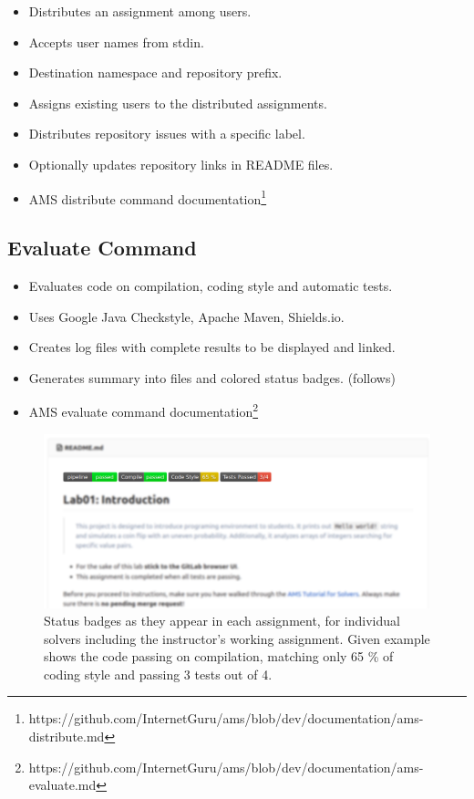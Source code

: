 \begin{itemize}
\item
  {Distributes an assignment among users.}
\item
  {Accepts user names from stdin.}
\item
  {Destination namespace and repository prefix.}
\item
  {Assigns existing users to the distributed assignments.}
\item
  {Distributes repository issues with a specific label.}
\item
  {Optionally updates repository links in README files.}
\item
  {AMS distribute command documentation\footnote{https://github.com/InternetGuru/ams/blob/dev/documentation/ams-distribute.md}}
\end{itemize}

\subsection{Evaluate Command}\label{ssec:evalcmd}

\begin{itemize}
\item
  {Evaluates code on compilation, coding style and automatic tests.}
\item
  {Uses Google Java Checkstyle, Apache Maven, Shields.io.}
\item
  {Creates log files with complete results to be displayed and linked.}
\item
  {Generates summary into files and colored status badges. (follows)}
\item
  {AMS evaluate command documentation\footnote{https://github.com/InternetGuru/ams/blob/dev/documentation/ams-evaluate.md}}
\end{itemize}

\begin{figure}[H]
    \centering
    \includegraphics[width=\textwidth,height=\textheight,keepaspectratio]{Figures/impl/image1.png}
    \caption[Example status badges]{Status badges as they appear in each assignment, for individual solvers including the instructor's working assignment. Given example shows the code passing on compilation, matching only 65 \% of coding style and passing 3 tests out of 4.}
\end{figure}

